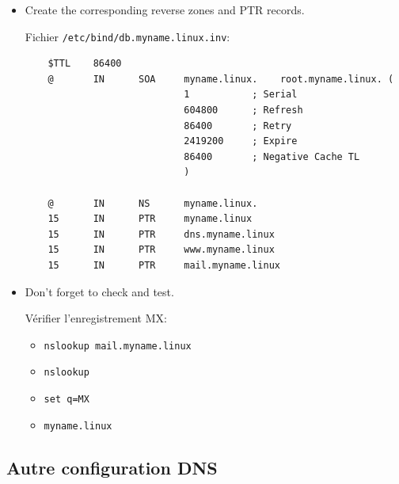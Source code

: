 \documentclass[a4paper]{article}
\begin{document}
\begin{itemize}
\item Create the corresponding reverse zones and PTR records.
\begin{example}
Fichier \texttt{/etc/bind/db.myname.linux.inv}:
\begin{verbatim}
    $TTL    86400
    @       IN      SOA     myname.linux.    root.myname.linux. (
                            1           ; Serial
                            604800      ; Refresh
                            86400       ; Retry
                            2419200     ; Expire
                            86400       ; Negative Cache TL
                            )

    @       IN      NS      myname.linux.
    15      IN      PTR     myname.linux
    15      IN      PTR     dns.myname.linux
    15      IN      PTR     www.myname.linux
    15      IN      PTR     mail.myname.linux
\end{verbatim}
\end{example}

\item Don’t forget to check and test.
\begin{example}
    Vérifier l'enregistrement MX:
    \begin{itemize}
        \item \texttt{nslookup mail.myname.linux}
        \item \texttt{nslookup}
        \item \texttt{set q=MX}
        \item \texttt{myname.linux}
    \end{itemize}
\end{example}

\end{itemize}










\subsection{Autre configuration DNS}
\end{document}

